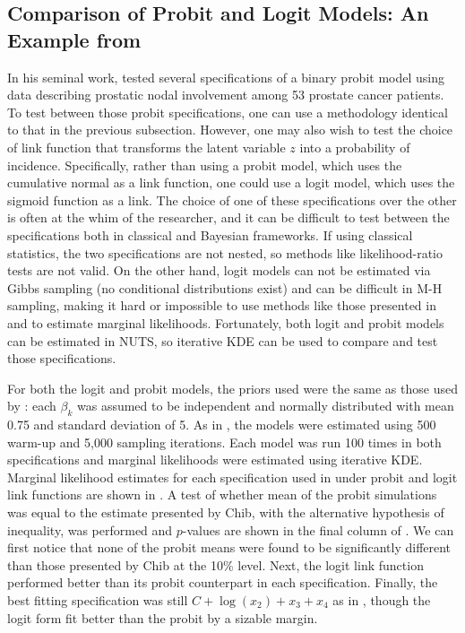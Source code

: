\documentclass[twocolumn]{article}
\begin{document}
\subsection{Comparison of Probit and Logit Models: An Example from \cite{Chib}}



In his seminal work, \cite{Chib} tested several specifications of a binary probit model using data describing prostatic nodal involvement among 53 prostate cancer patients. To test between those probit specifications, one can use a methodology identical to that in the previous subsection. However, one may also wish to test the choice of link function that transforms the latent variable $z$ into a probability of incidence. Specifically, rather than using a probit model, which uses the cumulative normal as a link function, one could use a logit model, which uses the sigmoid function as a link. The choice of one of these specifications over the other is often at the whim of the researcher, and it can be difficult to test between the specifications both in classical and Bayesian frameworks. If using classical statistics, the two specifications are not nested, so methods like likelihood-ratio tests are not valid. On the other hand, logit models can not be estimated via Gibbs sampling (no conditional distributions exist) and can be difficult in M-H sampling, making it hard or impossible to use methods like those presented in \cite{Chib} and \cite{ChibJeliazkov} to estimate marginal likelihoods. Fortunately, both logit and probit models can be estimated in NUTS, so iterative KDE can be used to compare and test those specifications.

For both the logit and probit models, the priors used were the same as those used by \cite{Chib}: each $\beta_k$ was assumed to be independent and normally distributed with mean 0.75 and standard deviation of 5. As in \cite{Chib}, the models were estimated using 500 warm-up and 5,000 sampling iterations. Each model was run 100 times in both specifications and marginal likelihoods were estimated using iterative KDE. Marginal likelihood estimates for each specification used in \cite{Chib} under probit and logit link functions are shown in . A test of whether mean of the probit simulations was equal to the estimate presented by Chib, with the alternative hypothesis of inequality, was performed and $p$-values are shown in the final column of . We can first notice that none of the probit means were found to be significantly different than those presented by Chib at the 10\% level. Next, the logit link function performed better than its probit counterpart in each specification. Finally, the best fitting specification was still $C + \log(x_2) + x_3 + x_4$ as in \cite{Chib}, though the logit form fit better than the probit by a sizable margin.
\end{document}
